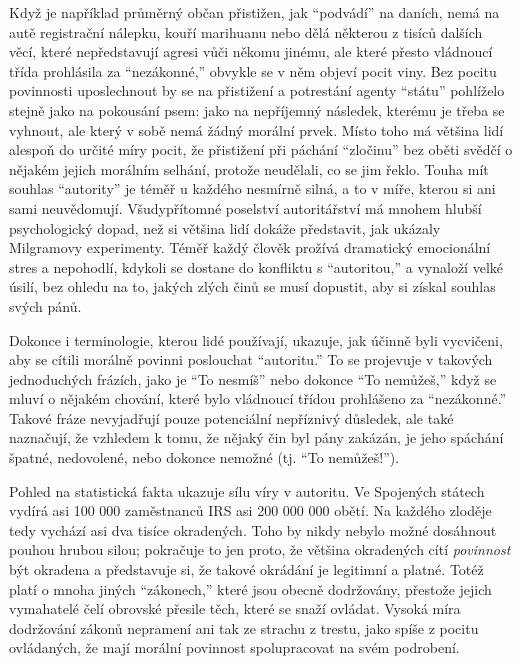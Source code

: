 \documentclass{book}
\begin{document}
Když je například průměrný občan přistižen, jak \enquote{podvádí} na daních, nemá na autě registrační nálepku, kouří marihuanu nebo dělá některou z tisíců dalších věcí, které nepředstavují agresi vůči někomu jinému, ale které přesto vládnoucí třída prohlásila za \enquote{nezákonné,} obvykle se v něm objeví pocit viny. Bez pocitu povinnosti uposlechnout by se na přistižení a potrestání agenty \enquote{státu} pohlíželo stejně jako na pokousání psem: jako na nepříjemný následek, kterému je třeba se vyhnout, ale který v sobě nemá žádný morální prvek. Místo toho má většina lidí alespoň do určité míry pocit, že přistižení při páchání \enquote{zločinu} bez oběti svědčí o nějakém jejich morálním selhání, protože neudělali, co se jim řeklo. Touha mít souhlas \enquote{autority} je téměř u každého nesmírně silná, a to v míře, kterou si ani sami neuvědomují. Všudypřítomné poselství autoritářství má mnohem hlubší psychologický dopad, než si většina lidí dokáže představit, jak ukázaly Milgramovy experimenty. Téměř každý člověk prožívá dramatický emocionální stres a nepohodlí, kdykoli se dostane do konfliktu s \enquote{autoritou,} a vynaloží velké úsilí, bez ohledu na to, jakých zlých činů se musí dopustit, aby si získal souhlas svých pánů.

Dokonce i terminologie, kterou lidé používají, ukazuje, jak účinně byli vycvičeni, aby se cítili morálně povinni poslouchat \enquote{autoritu.} To se projevuje v takových jednoduchých frázích, jako je \enquote{To nesmíš} nebo dokonce \enquote{To nemůžeš,} když se mluví o nějakém chování, které bylo vládnoucí třídou prohlášeno za \enquote{nezákonné.} Takové fráze nevyjadřují pouze potenciální nepříznivý důsledek, ale také naznačují, že vzhledem k tomu, že nějaký čin byl pány zakázán, je jeho spáchání špatné, nedovolené, nebo dokonce nemožné (tj. \enquote{To nemůžeš!}).

Pohled na statistická fakta ukazuje sílu víry v autoritu. Ve Spojených státech vydírá asi 100 000 zaměstnanců IRS asi 200 000 000 obětí. Na každého zloděje tedy vychází asi dva tisíce okradených. Toho by nikdy nebylo možné dosáhnout pouhou hrubou silou; pokračuje to jen proto, že většina okradených cítí \emph{povinnost} být okradena a představuje si, že takové okrádání je legitimní a platné. Totéž platí o mnoha jiných \enquote{zákonech,} které jsou obecně dodržovány, přestože jejich vymahatelé čelí obrovské přesile těch, které se snaží ovládat. Vysoká míra dodržování zákonů nepramení ani tak ze strachu z trestu, jako spíše z pocitu ovládaných, že mají morální povinnost spolupracovat na svém podrobení.
\end{document}
